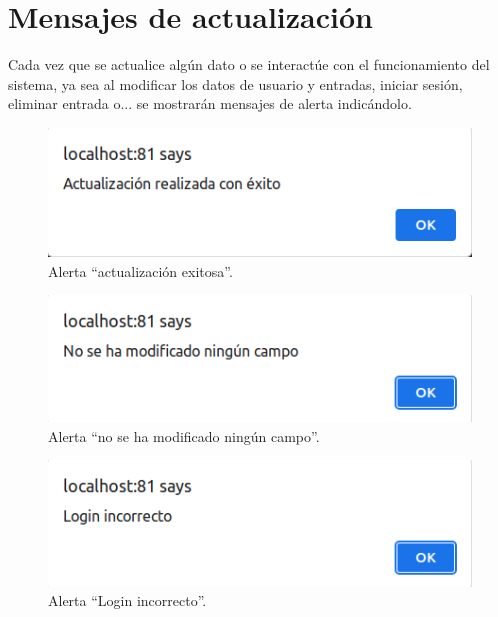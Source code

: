 \documentclass[12pt, twoside]{report}
\begin{document}
\section*{Mensajes de actualización}
\noindent Cada vez que se actualice algún dato o se interactúe con el funcionamiento del sistema, ya sea al modificar los datos de usuario y entradas, iniciar sesión, eliminar entrada o... se mostrarán mensajes de alerta indicándolo.\\
\begin{figure}[h]
\begin{center}
\includegraphics[scale=0.7]{images/actualización.png}
\end{center}
\caption{\label{inicio} Alerta ``actualización exitosa''.}
\end{figure}
\begin{figure}[h]
\begin{center}
\includegraphics[scale=0.7]{images/actualización2.png}
\end{center}
\caption{\label{inicio} Alerta ``no se ha modificado ningún campo''.}
\end{figure}
\begin{figure}[h]
\begin{center}
\includegraphics[scale=0.7]{images/actualización3.png}
\end{center}
\caption{\label{inicio} Alerta ``Login incorrecto''.}
\end{figure}
\end{document}
